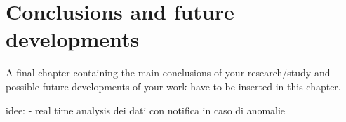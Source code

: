 \chapter{Conclusions and future developments}
\label{ch:conclusions}%
A final chapter containing the main conclusions of your research/study
and possible future developments of your work have to be inserted in this chapter.

idee:
- real time analysis dei dati con notifica in caso di anomalie